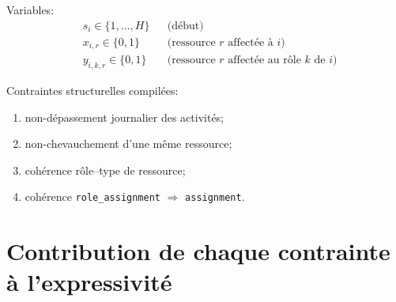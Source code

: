 \documentclass[12pt,a4paper]{article}
\begin{document}
Variables:
\begin{align*}
&s_i \in \{1,\dots,H\} &&\text{(début)} \\
&x_{i,r}\in\{0,1\} &&\text{(ressource }r\text{ affectée à }i) \\
&y_{i,k,r}\in\{0,1\} &&\text{(ressource }r\text{ affectée au rôle }k\text{ de }i)
\end{align*}

Contraintes structurelles compilées:
\begin{enumerate}
  \item non-dépassement journalier des activités;
  \item non-chevauchement d'une même ressource;
  \item cohérence rôle--type de ressource;
  \item cohérence \texttt{role\_assignment} $\Rightarrow$ \texttt{assignment}.
\end{enumerate}

\section{Contribution de chaque contrainte à l'expressivité}
\end{document}
